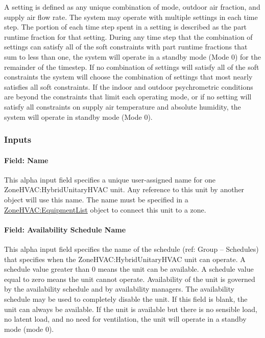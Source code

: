 A setting is defined as any unique combination of mode, outdoor air fraction, and supply air flow rate. The system may operate with multiple settings in each time step. The portion of each time step spent in a setting is described as the part runtime fraction for that setting. During any time step that the combination of settings can satisfy all of the soft constraints with part runtime fractions that sum to less than one, the system will operate in a standby mode (Mode 0) for the remainder of the timestep. If no combination of settings will satisfy all of  the soft constraints the system will choose the combination of settings that most nearly satisfies all soft constraints. If the indoor and outdoor psychrometric conditions are beyond the constraints that limit each operating mode, or if no setting will satisfy all constraints on supply air temperature and absolute humidity, the system will operate in standby mode (Mode 0).

\subsubsection{Inputs}

\paragraph{Field: Name}

This alpha input field specifies a unique user-assigned name for one ZoneHVAC:HybridUnitaryHVAC unit. Any reference to this unit by another object will use this name. The name must be specified in a \hyperref[zonehvacequipmentlist]{ZoneHVAC:EquipmentList} object to connect this unit to a zone.

\paragraph{Field: Availability Schedule Name}
This alpha input field specifies the name of the schedule (ref: Group – Schedules) that specifies when the ZoneHVAC:HybridUnitaryHVAC unit can operate. A schedule value greater than 0 means the unit can be available. A schedule value equal to zero means the unit cannot operate. Availability of the unit is governed by the availability schedule and by availability managers. The availability schedule may be used to completely disable the unit.  If this field is blank, the unit can always be available. If the unit is available but there is no sensible load, no latent load, and no need for ventilation, the unit will operate in a standby mode (mode 0).

